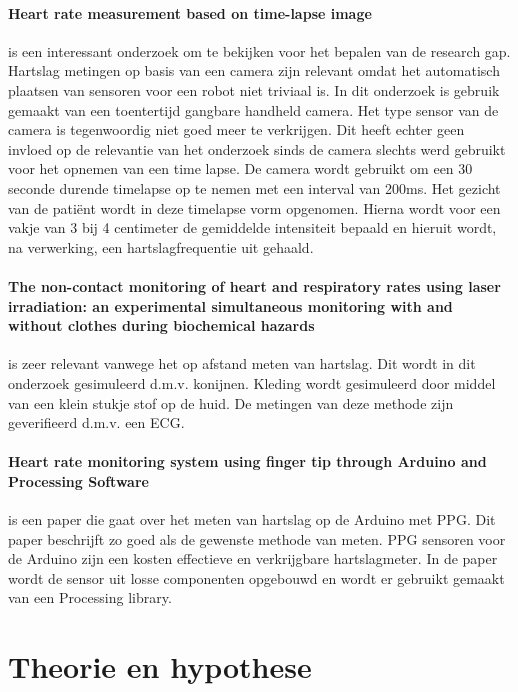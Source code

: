 \documentclass[11pt]{article}
\begin{document}
    \paragraph{Heart rate measurement based on time-lapse image} is een interessant onderzoek om te bekijken voor het bepalen van de research gap. 
    Hartslag metingen op basis van een camera zijn relevant omdat het automatisch plaatsen van sensoren voor een robot niet triviaal is. 
    In dit onderzoek is gebruik gemaakt van een toentertijd gangbare handheld camera. 
    Het type sensor van de camera is tegenwoordig niet goed meer te verkrijgen. 
    Dit heeft echter geen invloed op de relevantie van het onderzoek sinds de camera slechts werd gebruikt voor het opnemen van een time lapse. 
    De camera wordt gebruikt om een 30 seconde durende timelapse op te nemen met een interval van 200ms. 
    Het gezicht van de patiënt wordt in deze timelapse vorm opgenomen. 
    Hierna wordt voor een vakje van 3 bij 4 centimeter de gemiddelde intensiteit bepaald en hieruit wordt, na verwerking, een hartslagfrequentie uit gehaald.

    \paragraph{The non-contact monitoring of heart and respiratory rates using laser irradiation: an experimental simultaneous monitoring with and without clothes during biochemical hazards} is zeer relevant vanwege het op afstand meten van hartslag. 
    Dit wordt in dit onderzoek gesimuleerd d.m.v. konijnen. Kleding wordt gesimuleerd door middel van een klein stukje stof op de huid. 
    De metingen van deze methode zijn geverifieerd d.m.v. een ECG.

    \paragraph{Heart rate monitoring system using finger tip through Arduino and Processing Software} is een paper die gaat over het meten van hartslag op de Arduino met PPG. 
    Dit paper beschrijft zo goed als de gewenste methode van meten. 
    PPG sensoren voor de Arduino zijn een kosten effectieve en verkrijgbare hartslagmeter. 
    In de paper wordt de sensor uit losse componenten opgebouwd en wordt er gebruikt gemaakt van een Processing library.


    \section{Theorie en hypothese}\label{sec:theorie-en-hypothese}
\end{document}
